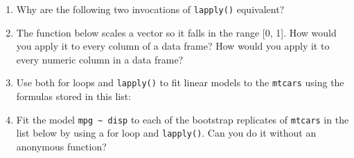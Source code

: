 \begin{enumerate}
\def\labelenumi{\arabic{enumi}.}
\item
  Why are the following two invocations of \texttt{lapply()} equivalent?

\begin{Shaded}
\begin{Highlighting}[]
\StringTok{ }\NormalTok{(}\NormalTok{, }\NormalTok{, }\NormalTok{, }\NormalTok{)}
\StringTok{ }\NormalTok{(}\NormalTok{)}

 
 
\end{Highlighting}
\end{Shaded}
\item
  The function below scales a vector so it falls in the range {[}0,
  1{]}. How would you apply it to every column of a data frame? How
  would you apply it to every numeric column in a data frame?

\begin{Shaded}
\begin{Highlighting}[]
\StringTok{ }
  \StringTok{ } \NormalTok{)}
  \StringTok{ }\NormalTok{rng[}\NormalTok{]) /}\StringTok{ }\NormalTok{(rng[}\NormalTok{] -}\StringTok{ }\NormalTok{rng[}\NormalTok{])}
\NormalTok{\}}
\end{Highlighting}
\end{Shaded}
\item
  Use both for loops and \texttt{lapply()} to fit linear models to the
  \texttt{mtcars} using the formulas stored in this list:

\begin{Shaded}
\begin{Highlighting}[]
\StringTok{ }\NormalTok{(}
  \StringTok{ }
  \StringTok{ }\NormalTok{(} \NormalTok{/}\StringTok{ }
  \StringTok{ }\StringTok{ }
  \StringTok{ }\NormalTok{(} \NormalTok{/}\StringTok{ }\StringTok{ }
\NormalTok{)}
\end{Highlighting}
\end{Shaded}
\item
  Fit the model \texttt{mpg \textasciitilde{} disp} to each of the
  bootstrap replicates of \texttt{mtcars} in the list below by using a
  for loop and \texttt{lapply()}. Can you do it without an anonymous
  function?


\end{enumerate}

